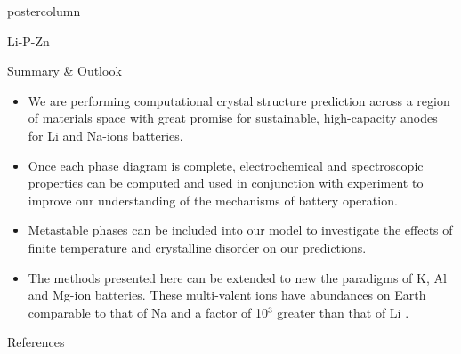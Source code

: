 \documentclass{beamer}
\begin{document}
\begin{frame}
\begin{columns}
\begin{column}{.32\textwidth}
\begin{beamercolorbox}[center]{postercolumn}
\begin{minipage}{.98\textwidth}
{\begin{myblock}{Li-P-Zn}
          \end{myblock}
          \begin{myblock}{Summary \& Outlook}
              \begin{itemize}
                  \item We are performing computational crystal structure prediction across a region of materials space with great promise for sustainable, high-capacity anodes for Li and Na-ions batteries.
                  \item Once each phase diagram is complete, electrochemical and spectroscopic properties can be computed and used in conjunction with experiment to improve our understanding of the mechanisms of battery operation.
                  \item Metastable phases can be included into our model to investigate the effects of finite temperature and crystalline disorder on our predictions.
                  \item The methods presented here can be extended to new the paradigms of K, Al and Mg-ion batteries. These multi-valent ions have abundances on Earth comparable to that of Na and a factor of 10$^3$ greater than that of Li \cite{Grey2016}.
                \end{itemize}
					\end{myblock}\vfill
					\begin{myblock}{References}
						\footnotesize
            
						
					\end{myblock}\vfill
		}\end{minipage}\end{beamercolorbox}
	\end{column}
\end{columns}
\end{frame}
\end{document}
